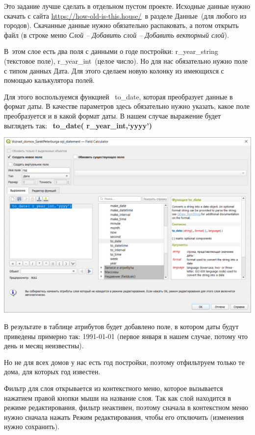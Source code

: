 \documentclass[
]{book}
\begin{document}
Это задание лучше сделать в отдельном пустом проекте. Исходные данные нужно скачать с сайта \href{https://how-old-is-this.house/}{\underline{https://how-old-is-this.house/}}~в разделе Данные~(для любого из городов). Скачанные данные нужно обязательно распаковать, а потом открыть файл (в строке меню \emph{Слой -- Добавить слой -- Добавить векторный слой}).

В~этом слое есть два поля с данными о годе постройки: r\_year\_string (текстовое поле), r\_year\_int~(целое число). Но для нас обязательно нужно поле с типом данных Дата. Для этого сделаем новую колонку из имеющихся с помощью калькулятора полей.

Для этого воспользуемся функцией ~to\_date, которая преобразует данные в формат даты. В качестве параметров здесь обязательно нужно указать, какое поле преобразуется и в какой формат даты. В нашем случае выражение будет выглядеть так: ~\textbf{to\_date( r\_year\_int,`yyyy')}

\includegraphics{figures/59.png}

В результате в таблице атрибутов будет добавлено поле, в котором даты будут приведены примерно так: 1991-01-01 (первое января в нашем случае, потому что день и месяц неизвестны).

Но не для всех домов у нас есть год постройки, поэтому отфильтруем только те дома, для которых год известен.

Фильтр для слоя открывается из контекстного меню, которое вызывается нажатием правой кнопки мыши на название слоя. Так как слой находится в режиме редактирования, фильтр неактивен, поэтому сначала в контекстном меню нужно сначала нажать Режим редактирования, чтобы его отключить (изменения нужно сохранить).
\end{document}
